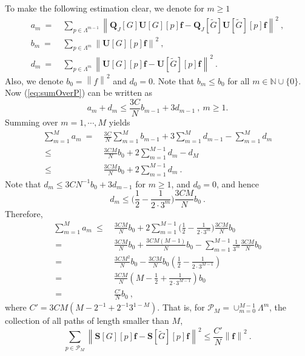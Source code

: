 \documentclass{article}
\def\NN{\mathbb{N}}
\def\cP{\mathcal{P}}
\def\tG{\tilde{G}}
\def\BQ{\boldsymbol{Q}}
\def\BS{\boldsymbol{S}}
\def\BU{\boldsymbol{U}}
\def\Bf{\boldsymbol{f}}
\newcommand{\norm}[1]{\left\lVert#1\right\rVert}
\begin{document}
To make the following estimation clear,  we denote for $m \geq 1$
\begin{equation*}
\begin{aligned}
a_m ~=~ & \sum_{p \in \Lambda^{m-1}} \norm{\BQ_J[G]\BU[G][p]\Bf - \BQ_J[\tG]\BU[\tG][p]\Bf}^2 ~, \\
b_m ~=~ & \sum_{p \in \Lambda^m} \norm{\BU[G][p]\Bf}^2 ~, \\
d_m ~=~ & \sum_{p \in \Lambda^m} \norm{\BU[G][p]\Bf-\BU[\tG][p]\Bf}^2 ~.
\end{aligned}
\end{equation*}
Also, we denote $b_0 = \norm{f}^2$ and $d_0 = 0$.
Note that $b_m \leq b_0$ for all $m \in \NN \cup \{0\}$. Now (\ref{eq:sumOverP}) can be written as
\begin{equation}
a_m + d_m \leq \frac{3C}{N} b_{m-1} + 3 d_{m-1} ~,~ m \geq 1.
\end{equation}
Summing over $m = 1, \cdots, M$ yields
\begin{equation}
\begin{aligned}
\sum_{m=1}^M a_m ~=~ & \frac{3C}{N} \sum_{m=1}^M b_{m-1} + 3 \sum_{m=1}^M d_{m-1} - \sum_{m=1}^M d_m \\
~\leq~ & \frac{3CM}{N} b_0 + 2 \sum_{m=1}^{M-1} d_m - d_M \\
~\leq~ & \frac{3CM}{N} b_0 + 2 \sum_{m=1}^{M-1} d_m ~.
\end{aligned}
\end{equation}
Note that $d_m \leq 3CN^{-1} b_0 + 3 d_{m-1}$ for $m \geq 1$, and $d_0 = 0$, and hence
\begin{equation}
d_m \leq \Bigg( \frac{1}{2} - \frac{1}{2 \cdot 3^m} \Bigg) \frac{3CM}{N} b_0 ~.
\end{equation}
Therefore,
\begin{equation}
\begin{aligned}
\sum_{m=1}^M a_m ~\leq~ & \frac{3CM}{N} b_0 + 2 \sum_{m=1}^{M-1} \Bigg( \frac{1}{2} - \frac{1}{2 \cdot 3^m} \Bigg) \frac{3CM}{N} b_0 \\
~=~ & \frac{3CM}{N} b_0 + \frac{3CM(M-1)}{N} b_0 - \sum_{m=1}^{M-1} \frac{1}{3^m} \frac{3CM}{N} b_0 \\
~=~ & \frac{3CM^2}{N} b_0 - \frac{3CM}{N} b_0 \left( \frac{1}{2} - \frac{1}{2 \cdot 3^{M-1}} \right) \\
~=~ & \frac{3CM}{N} \left( M - \frac{1}{2} + \frac{1}{2 \cdot 3^{M-1}} \right) b_0 \\
~=~ & \frac{C'}{N} b_0 ~,
\end{aligned}
\end{equation} 
where $C' = 3CM \left( M - 2^{-1} + 2^{-1} 3^{1-M} \right)$. That is, for $\cP_M = \cup_{m=0}^{M-1} \Lambda^m$, the collection of all paths of length smaller than $M$,
\begin{equation}
\sum_{p \in \cP_M} \norm{\BS[G][p]\Bf - \BS[\tG][p]\Bf}^2 \leq \frac{C'}{N} \norm{\Bf}^2 ~.
\end{equation}
\end{document}
